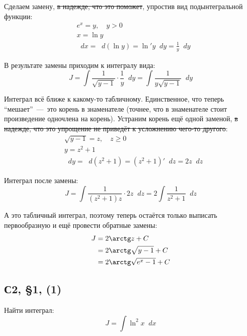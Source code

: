 \documentclass[a4paper,12pt]{article}
\newcommand{\diff}{\mathop{}\!d\!}
\begin{document}
  \begin{solution}
    Сделаем замену, \sout{в надежде, что это поможет}, упростив вид подынтегральной функции:
    \[
      \begin{aligned}
        &e^x = y,\quad y > 0\\
        &x = \ln y\\
        &\diff x = \diff (\ln y) = \ln'\! y \diff y = \frac{1}{y} \diff y
      \end{aligned}
    \]
    
    В результате замены приходим к интегралу вида:
    \[
      J = \int \frac{1}{\sqrt{y - 1}} \cdot \frac{1}{y} \diff y = \int \frac{1}{y \sqrt{y - 1}} \diff y
    \]
    
    Интеграл всё ближе к какому-то табличному.
    Единственное, что теперь ``мешает''~---~это корень в знаменателе (точнее, что в знаменателе стоит произведение одночлена на корень).
    Устраним корень ещё одной заменой, \sout{в надежде, что это упрощение не приведёт к усложнению чего-то другого}:
    \[
      \begin{aligned}
        &\sqrt{y - 1} = z,\quad z \geq 0\\
        &y = z^2 + 1\\
        &\diff y = \diff (z^2 + 1) = (z^2 + 1)' \diff z = 2z \diff z
      \end{aligned}
    \]
    
    Интеграл после замены:
    \[
      J = \int \frac{1}{(z^2 + 1) z} \cdot 2z \diff z = 2 \int \frac{1}{z^2 + 1} \diff z
    \]
    
    А это табличный интеграл, поэтому теперь остаётся только выписать первообразную и ещё провести обратные замены:
    \begin{equation*}
    \begin{split}
      J &= 2 \arctg z + C\\
        &= 2 \arctg \sqrt{y - 1} + C\\
        &= 2 \arctg \sqrt{e^x - 1} + C
    \end{split}
    \end{equation*}
  \end{solution}
  
  
  \subsection{С2, \S 1, (1)}
  
  Найти интеграл:
  \[
    J = \int \ln^2 x \diff x
  \]
  
\end{document}
